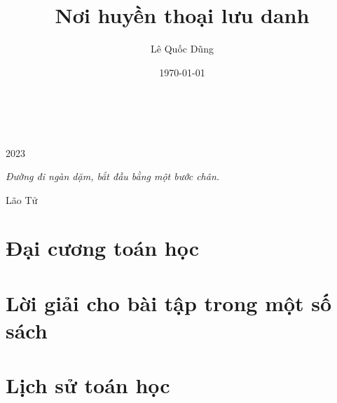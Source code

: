 \documentclass[oneside]{book}
\title{Nơi huyền thoại lưu danh}
\author{Lê Quốc Dũng}
\date{\today}
\begin{document}
\begin{titlepage}
		\\
			
		\vspace{10mm}
		\\
		\vspace{\fill}
		\centering \large{2023}
\end{titlepage}

\newpage

\vspace*{2cm}

\begin{center}
	\Large{\parbox{10cm}{
		\begin{raggedright}
		{\Large 
			\textit{Đường đi ngàn dặm, bắt đầu bằng một bước chân.}
		}
	
		\vspace{.5cm}\hfill{Lão Tử}
		\end{raggedright}
	}
}
\end{center}

\newpage

\tableofcontents

\newpage



\part{Đại cương toán học}







\part{Lời giải cho bài tập trong một số sách}


\part{Lịch sử toán học}

\end{document}
